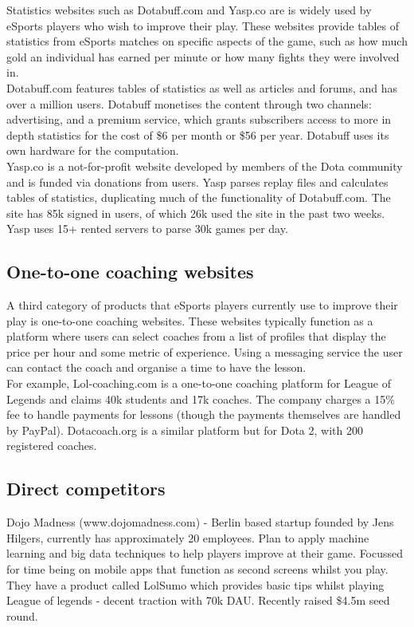 \documentclass[12pt]{report} %
\begin{document}
Statistics websites such as Dotabuff.com and Yasp.co are is widely used by eSports players who wish to improve their play. These websites provide tables of statistics from eSports matches on specific aspects of the game, such as how much gold an individual has earned per minute or how many fights they were involved in.\\
 
Dotabuff.com features tables of statistics as well as articles and forums, and has over a million users. Dotabuff monetises the content through two channels: advertising, and a premium service, which grants subscribers access to more in depth statistics for the cost of \$6 per month or \$56 per year. Dotabuff uses its own hardware for the computation.\\
 
Yasp.co is a not-for-profit website developed by members of the Dota community and is funded via donations from users. Yasp parses replay files and calculates tables of statistics, duplicating much of the functionality of Dotabuff.com. The site has 85k signed in users, of which 26k used the site in the past two weeks. Yasp uses 15+ rented servers to parse 30k games per day.
 
\subsection{One-to-one coaching websites }
 
A third category of products that eSports players currently use to improve their play is one-to-one coaching websites. These websites typically function as a platform where users can select coaches from a list of profiles that display the price per hour and some metric of experience. Using a messaging service the user can contact the coach and organise a time to have the lesson.\\
 
For example, Lol-coaching.com is a one-to-one coaching platform for League of Legends and claims 40k students and 17k coaches. The company charges a 15\% fee to handle payments for lessons (though the payments themselves are handled by PayPal). Dotacoach.org is a similar platform but for Dota 2, with 200 registered coaches.

\subsection{Direct competitors}

Dojo Madness (www.dojomadness.com) - Berlin based startup founded by Jens Hilgers, currently has approximately 20 employees. Plan to apply machine learning and big data techniques to help players improve at their game. Focussed for time being on mobile apps that function as second screens whilst you play. They have a product called LolSumo which provides basic tips whilst playing League of legends - decent traction with 70k DAU. Recently raised \$4.5m seed round.\\
\end{document}
